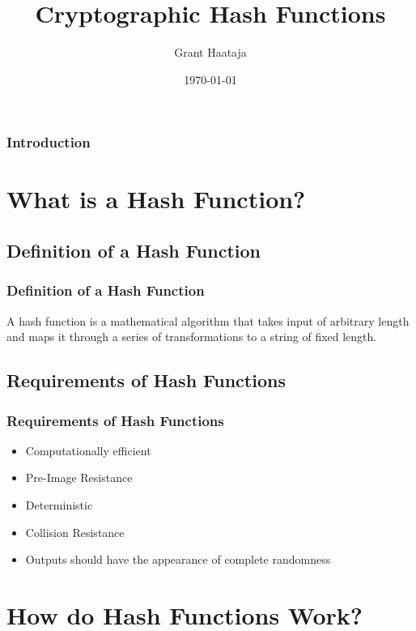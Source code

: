 \documentclass{beamer}
\title{Cryptographic Hash Functions}
\author{Grant Haataja}
\date{\today}
\begin{document}
\begin{frame}
	\titlepage
\end{frame}	

\begin{frame}
\frametitle{Introduction}
	\tableofcontents
\end{frame}

\section{What is a Hash Function?}

\subsection{Definition of a Hash Function}
\begin{frame}
\frametitle{Definition of a Hash Function}
	A hash function is a mathematical algorithm that takes input of arbitrary length and maps it through a series of transformations to a string of fixed length.
\end{frame}

\subsection{Requirements of Hash Functions}
\begin{frame}
\frametitle{Requirements of Hash Functions}
	\begin{itemize}
		\item Computationally efficient
		\item Pre-Image Resistance 
		\item Deterministic  
		\item Collision Resistance
		\item Outputs should have the appearance of complete randomness
	\end{itemize}
\end{frame}

\section{How do Hash Functions Work?}
\end{document}
